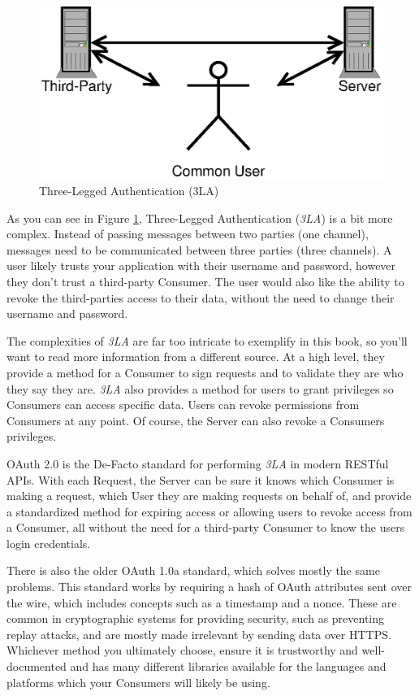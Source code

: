 \documentclass{book}
\begin{document}
\begin{figure}[!htb]
\centering
\includegraphics[scale=.6]{images/three-legged.eps}
\caption{Three-Legged Authentication (3LA)}
\label{fig:threelegged}
\end{figure}

As you can see in Figure \ref{fig:threelegged}, Three-Legged Authentication (\emph{3LA}) is a bit more complex. Instead of passing messages between two parties (one channel), messages need to be communicated between three parties (three channels). A user likely trusts your application with their username and password, however they don't trust a third-party Consumer. The user would also like the ability to revoke the third-parties access to their data, without the need to change their username and password.

The complexities of \emph{3LA} are far too intricate to exemplify in this book, so you'll want to read more information from a different source. At a high level, they provide a method for a Consumer to sign requests and to validate they are who they say they are. \emph{3LA} also provides a method for users to grant privileges so Consumers can access specific data. Users can revoke permissions from Consumers at any point. Of course, the Server can also revoke a Consumers privileges.

OAuth 2.0 \cite{RFC6749} is the De-Facto standard for performing \emph{3LA} in modern RESTful APIs. With each Request, the Server can be sure it knows which Consumer is making a request, which User they are making requests on behalf of, and provide a standardized method for expiring access or allowing users to revoke access from a Consumer, all without the need for a third-party Consumer to know the users login credentials.

There is also the older OAuth 1.0a \cite{RFC5849} standard, which solves mostly the same problems. This standard works by requiring a hash of OAuth attributes sent over the wire, which includes concepts such as a timestamp and a nonce. These are common in cryptographic systems for providing security, such as preventing replay attacks, and are mostly made irrelevant by sending data over HTTPS. Whichever method you ultimately choose, ensure it is trustworthy and well-documented and has many different libraries available for the languages and platforms which your Consumers will likely be using.
\end{document}
